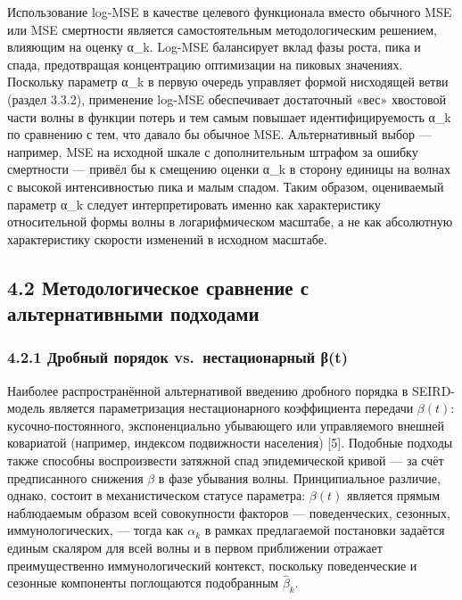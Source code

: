 \documentclass[12pt]{article}
\begin{document}
Использование log-MSE в качестве целевого функционала вместо обычного
MSE или MSE смертности является самостоятельным методологическим
решением, влияющим на оценку α\_k. Log-MSE балансирует вклад фазы роста,
пика и спада, предотвращая концентрацию оптимизации на пиковых
значениях. Поскольку параметр α\_k в первую очередь управляет формой
нисходящей ветви (раздел 3.3.2), применение log-MSE обеспечивает
достаточный «вес» хвостовой части волны в функции потерь и тем самым
повышает идентифицируемость α\_k по сравнению с тем, что давало бы
обычное MSE. Альтернативный выбор --- например, MSE на исходной шкале с
дополнительным штрафом за ошибку смертности --- привёл бы к смещению
оценки α\_k в сторону единицы на волнах с высокой интенсивностью пика и
малым спадом. Таким образом, оцениваемый параметр α\_k следует
интерпретировать именно как характеристику относительной формы волны в
логарифмическом масштабе, а не как абсолютную характеристику скорости
изменений в исходном масштабе.

\subsection{4.2 Методологическое сравнение с альтернативными
подходами}\label{ux43cux435ux442ux43eux434ux43eux43bux43eux433ux438ux447ux435ux441ux43aux43eux435-ux441ux440ux430ux432ux43dux435ux43dux438ux435-ux441-ux430ux43bux44cux442ux435ux440ux43dux430ux442ux438ux432ux43dux44bux43cux438-ux43fux43eux434ux445ux43eux434ux430ux43cux438-1}

\subsubsection{4.2.1 Дробный порядок vs.~нестационарный
β(t)}\label{ux434ux440ux43eux431ux43dux44bux439-ux43fux43eux440ux44fux434ux43eux43a-vs.-ux43dux435ux441ux442ux430ux446ux438ux43eux43dux430ux440ux43dux44bux439-ux3b2t-1}

Наиболее распространённой альтернативой введению дробного порядка в
SEIRD-модель является параметризация нестационарного коэффициента
передачи \(\beta(t)\): кусочно-постоянного, экспоненциально убывающего
или управляемого внешней ковариатой (например, индексом подвижности
населения) {[}5{]}. Подобные подходы также способны воспроизвести
затяжной спад эпидемической кривой --- за счёт предписанного снижения
\(\beta\) в фазе убывания волны. Принципиальное различие, однако,
состоит в механистическом статусе параметра: \(\beta(t)\) является
прямым наблюдаемым образом всей совокупности факторов --- поведенческих,
сезонных, иммунологических, --- тогда как \(\alpha_k\) в рамках
предлагаемой постановки задаётся единым скаляром для всей волны и в
первом приближении отражает преимущественно иммунологический контекст,
поскольку поведенческие и сезонные компоненты поглощаются подобранным
\(\hat{\beta}_k\).
\end{document}
